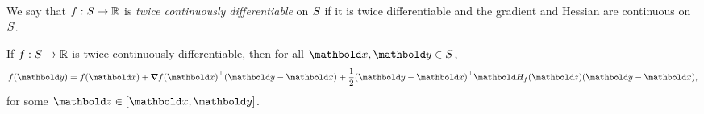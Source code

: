\begin{defn} We say that $f: S \to \mathbb{R}$ is \emph{twice continuously differentiable} on $S$ if it is twice differentiable and the gradient and Hessian are continuous on $S$.
\end{defn}

\begin{thm} If $f: S \to \mathbb{R}$ is twice continuously differentiable, then for all $\vx, \vy \in \sS$, \begin{align}
    f(\vy) = f(\vx) + \trans{\grad f(\vx)}(\vy - \vx) + \frac{1}{2}\trans{(\vy - \vx)}\mH_f(\vz)(\vy - \vx),
\end{align} for some $\vz \in [\vx,\vy]$.
\end{thm}